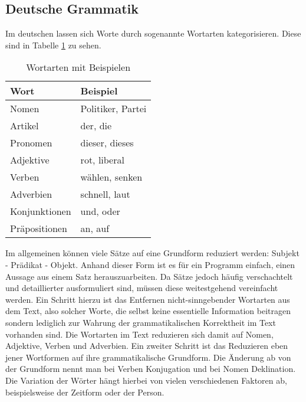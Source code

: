 \subsection{Deutsche Grammatik	}
Im deutschen lassen sich Worte durch sogenannte Wortarten kategorisieren. Diese sind in Tabelle \ref{wortarten} zu sehen. \\
\begin{table}
\center
\begin{tabular}{ll}
\hline
Wort & Beispiel \\
\hline
Nomen & Politiker, Partei \\
Artikel & der, die \\
Pronomen & dieser, dieses \\
Adjektive & rot, liberal \\
Verben & wählen, senken \\
Adverbien & schnell, laut \\
Konjunktionen & und, oder \\
Präpositionen & an, auf \\
\hline
\end{tabular}
\caption{\label{wortarten} Wortarten mit Beispielen}
\end{table}
Im allgemeinen können viele Sätze auf eine Grundform reduziert werden: Subjekt - Prädikat - Objekt. Anhand dieser Form ist es für ein Programm einfach,
einen Aussage aus einem Satz herauszuarbeiten. Da Sätze jedoch häufig verschachtelt und detaillierter ausformuliert sind, müssen diese weitestgehend vereinfacht
werden. Ein Schritt hierzu ist das Entfernen nicht-sinngebender Wortarten aus dem Text, also solcher Worte, die selbst keine essentielle Information beitragen 
sondern lediglich zur Wahrung der grammatikalischen Korrektheit im Text vorhanden sind. Die Wortarten im Text reduzieren sich damit auf Nomen, Adjektive, Verben
und Adverbien.
Ein zweiter Schritt ist das Reduzieren eben jener Wortformen auf ihre grammatikalische Grundform. Die Änderung ab von der Grundform nennt man bei Verben Konjugation
und bei Nomen Deklination. Die Variation der Wörter hängt hierbei von vielen verschiedenen Faktoren ab, beispielsweise der Zeitform oder der Person.

